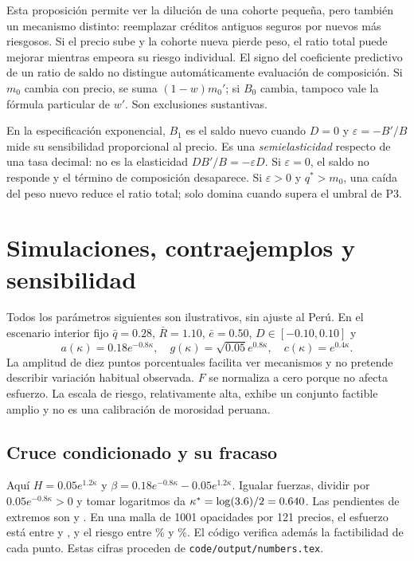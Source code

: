 \documentclass[11pt]{article}
\theoremstyle{definition}\newtheorem{assumption}{Supuesto}
\begin{document}
Esta proposición permite ver la dilución de una cohorte pequeña, pero también
un mecanismo distinto: reemplazar créditos antiguos seguros por nuevos más
riesgosos. Si el precio sube y la cohorte nueva pierde peso, el ratio total
puede mejorar mientras empeora su riesgo individual. El signo del coeficiente
predictivo de un ratio de saldo no distingue automáticamente evaluación de
composición. Si $m_0$ cambia con precio, se suma $(1-w)m_0'$; si $B_0$ cambia,
tampoco vale la fórmula particular de $w'$. Son exclusiones sustantivas.

En la especificación exponencial, $B_1$ es el saldo nuevo cuando $D=0$ y
$\varepsilon=-B'/B$ mide su sensibilidad proporcional al precio. Es una
\emph{semielasticidad} respecto de una tasa decimal: no es la elasticidad
$DB'/B=-\varepsilon D$. Si $\varepsilon=0$, el saldo no responde y el término
de composición desaparece. Si $\varepsilon>0$ y $q^*>m_0$, una caída del peso
nuevo reduce el ratio total; solo domina cuando supera el umbral de P3.

\section{Simulaciones, contraejemplos y sensibilidad}\label{sec:sim}
Todos los parámetros siguientes son ilustrativos, sin ajuste al Perú.
En el escenario interior fijo $\bar q=0.28$, $\bar R=1.10$,
$\bar e=0.50$, $D\in[-0.10,0.10]$ y
\[
a(\kappa)=0.18e^{-0.8\kappa},\quad
g(\kappa)=\sqrt{0.05}e^{0.8\kappa},\quad c(\kappa)=e^{0.4\kappa}.
\]
La amplitud de diez puntos porcentuales facilita ver mecanismos y no pretende
describir variación habitual observada. $F$ se normaliza a cero porque no
afecta esfuerzo. La escala de riesgo, relativamente alta, exhibe un conjunto
factible amplio y no es una calibración de morosidad peruana.

\subsection{Cruce condicionado y su fracaso}
Aquí $H=0.05e^{1.2\kappa}$ y $\beta=0.18e^{-0.8\kappa}-0.05e^{1.2\kappa}$.
Igualar fuerzas, dividir por $0.05e^{-0.8\kappa}>0$ y tomar logaritmos da
$\kappa^*=\log(3.6)/2=0.640$. Las pendientes de extremos son
\betaZero{} y \betaOne{}. En una malla de 1001 opacidades por 121 precios,
el esfuerzo está entre \effortMin{} y \effortMax{}, y el riesgo entre
\riskMin\% y \riskMax\%. El código verifica además la factibilidad de
cada punto. Estas cifras proceden de \texttt{code/output/numbers.tex}.
\end{document}
